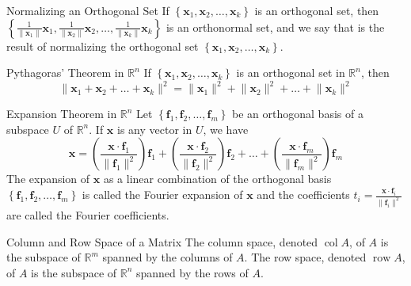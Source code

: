 \documentclass[12pt]{article}
\begin{document}
\begin{theorem}{Normalizing an Orthogonal Set}{}
    If $ \left\{ \mathbf{x}_1, \mathbf{x}_2, \dots, \mathbf{x}_k \right\} $ is an orthogonal set, then $ \left\{ \frac{1}{\lVert \mathbf{x}_1 \rVert} \mathbf{x}_1, \frac{1}{\lVert \mathbf{x}_2\rVert} \mathbf{x}_2, \dots, \frac{1}{\lVert \mathbf{x}_k \rVert} \mathbf{x}_k \right\} $ is an orthonormal set, and we say that is the result of normalizing the orthogonal set $ \left\{ \mathbf{x}_1, \mathbf{x}_2, \dots, \mathbf{x}_k \right\} $.
\end{theorem}

\begin{theorem}{Pythagoras' Theorem in $ \mathbb{R}^n $}{}
    If $ \left\{ \mathbf{x}_1, \mathbf{x}_2, \dots, \mathbf{x}_k \right\} $ is an orthogonal set in $ \mathbb{R}^n $, then
    \[ \lVert \mathbf{x}_1 + \mathbf{x}_2 + \dots + \mathbf{x}_k \rVert^2 = \lVert \mathbf{x}_1 \rVert^2 + \lVert \mathbf{x}_2 \rVert^2 + \dots + \lVert \mathbf{x}_k \rVert^2 \]
\end{theorem}

\begin{theorem}{Expansion Theorem in $ \mathbb{R}^n $}{}
    Let $ \left\{ \mathbf{f}_1, \mathbf{f}_2, \dots, \mathbf{f}_m \right\} $ be an orthogonal basis of a subspace $ U $ of $ \mathbb{R}^n $. If $ \mathbf{x} $ is any vector in $ U $, we have
    \[ \mathbf{x} = \left( \frac{\mathbf{x} \cdot \mathbf{f}_1}{\lVert \mathbf{f}_1 \rVert^2} \right) \mathbf{f}_1 + \left( \frac{\mathbf{x} \cdot \mathbf{f}_2}{\lVert \mathbf{f}_2 \rVert^2} \right) \mathbf{f}_2 + \dots + \left( \frac{\mathbf{x} \cdot \mathbf{f}_m}{\lVert \mathbf{f}_m \rVert^2} \right) \mathbf{f}_m \]
    The expansion of $ \mathbf{x} $ as a linear combination of the orthogonal basis $ \left\{ \mathbf{f}_1, \mathbf{f}_2, \dots, \mathbf{f}_m \right\} $ is called the Fourier expansion of $ \mathbf{x} $ and the coefficients $ t_i = \frac{\mathbf{x} \cdot \mathbf{f}_i}{\lVert \mathbf{f}_i \rVert^2 } $ are called the Fourier coefficients.
\end{theorem}

\begin{definition}{Column and Row Space of a Matrix}{}
    The column space, denoted $ \operatorname{col} A $, of $ A $ is the subspace of $ \mathbb{R}^m $ spanned by the columns of $ A $.
    \medskip
    \newline
    The row space, denoted $ \operatorname{row} A $, of $ A $ is the subspace of $ \mathbb{R}^n $ spanned by the rows of $ A $.
\end{definition}
\end{document}
